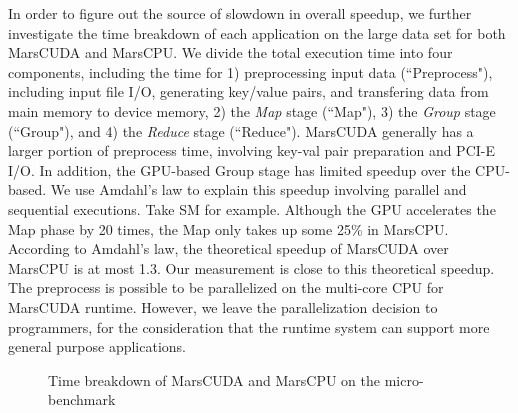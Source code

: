 In order to figure out the source of slowdown in overall speedup, we further investigate the time breakdown of each application on the large data set for both MarsCUDA and MarsCPU. We divide the total execution time into four components,
including the time for 1) preprocessing input data (``Preprocess"), including input file I/O, generating key/value pairs, and transfering data from main memory to device memory, 2) the
{\em Map} stage (``Map"), 3) the {\em Group} stage (``Group"), and 4) the {\em
Reduce} stage (``Reduce"). 
MarsCUDA generally has a larger portion of preprocess time, involving key-val pair preparation and PCI-E I/O. In addition, the GPU-based Group stage has limited speedup over the CPU-based. We use Amdahl's law to explain this speedup involving parallel and sequential executions. Take SM for example. Although the GPU accelerates the Map phase by 20 times, the Map only takes up some 25\% in MarsCPU. According to Amdahl's law, the theoretical speedup of MarsCUDA over MarsCPU is at most 1.3. Our measurement is close to this theoretical speedup.
The preprocess is possible to be parallelized on the multi-core CPU for MarsCUDA runtime. 
However, we leave the parallelization decision to programmers, for the consideration that the runtime system can support more general purpose applications. 

\begin{figure}[h]
\centerline{  \hfill {} } \caption{Time breakdown of MarsCUDA
and MarsCPU on the micro-benchmark} \label{fig:timebreakdown}
\end{figure}

